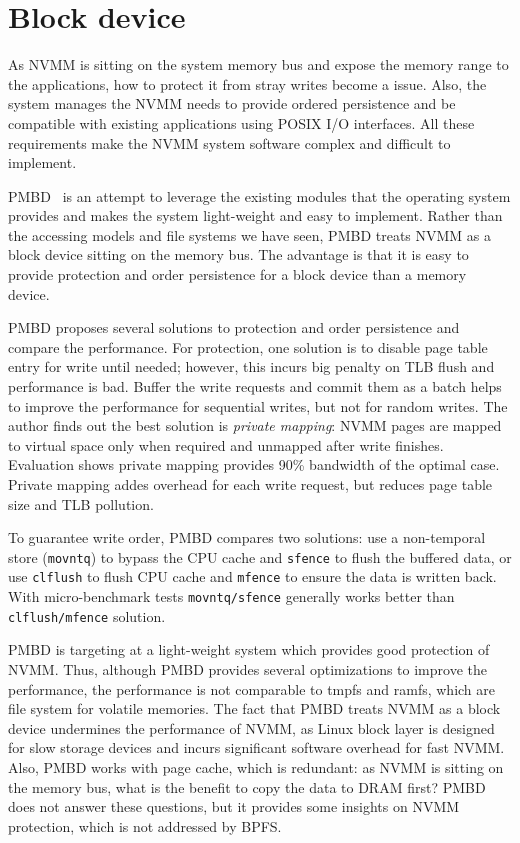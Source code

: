 \section{Block device} 
\label{sec:bd}

As NVMM is sitting on the system memory bus and expose the memory range
to the applications, how to protect it from stray writes become a issue.
Also, the system manages the NVMM needs to provide ordered persistence
and be compatible with existing applications using POSIX I/O interfaces.
All these requirements make the NVMM system software complex and difficult
to implement.


PMBD~\cite{PMBD} is an attempt to leverage the existing modules that the 
operating system provides and makes the system light-weight and easy to
implement. Rather than the accessing models and file systems we have seen,
PMBD treats NVMM as a block device sitting on the memory bus. The advantage
is that it is easy to provide protection and order persistence for
a block device than a memory device.

PMBD proposes several solutions to protection and order persistence and
compare the performance. For protection, one solution is to disable page
table entry for write until needed; however, this incurs big penalty on
TLB flush and performance is bad. Buffer the write requests and commit
them as a batch helps to improve the performance for sequential writes,
but not for random writes. The author finds out the best solution is 
\emph{private mapping}: NVMM pages are mapped to virtual space only when
required and unmapped after write finishes. Evaluation shows private
mapping provides 90\% bandwidth of the optimal case. Private mapping
addes overhead for each write request, but reduces page table size and
TLB pollution.

To guarantee write order, PMBD compares two solutions: use a non-temporal
store (\texttt{movntq}) to bypass the CPU cache and \texttt{sfence} to
flush the buffered data, or use \texttt{clflush} to flush CPU cache
and \texttt{mfence} to ensure the data is written back. With micro-benchmark
tests \texttt{movntq/sfence} generally works better than \texttt{clflush/mfence}
solution.

PMBD is targeting at a light-weight system which provides good 
protection of NVMM. Thus, although PMBD provides several optimizations
to improve the performance, the performance is not comparable to tmpfs
and ramfs, which are file system for volatile memories. The fact that
PMBD treats NVMM as a block device undermines the performance of NVMM,
as Linux block layer is designed for slow storage devices and incurs
significant software overhead for fast NVMM. Also, PMBD works with page
cache, which is redundant: as NVMM is sitting on the memory bus, what is
the benefit to copy the data to DRAM first? PMBD does not answer these
questions, but it provides some insights on NVMM protection, which is
not addressed by BPFS.

